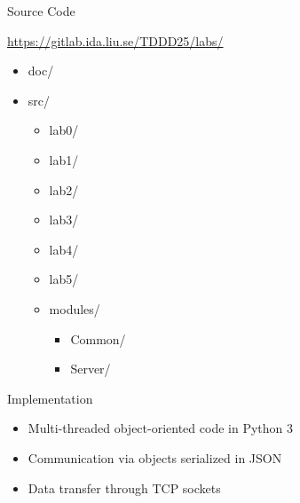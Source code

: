\documentclass[compress,xcolor=table]{beamer}
\begin{document}
\begin{frame}{Source Code}
  \centering
  \begin{center}
    \url{https://gitlab.ida.liu.se/TDDD25/labs/}
  \end{center}
  \begin{itemize}
    \item doc/
    \item src/
      \begin{itemize}
        \item lab0/
        \item lab1/
        \item lab2/
        \item lab3/
        \item lab4/
        \item lab5/
        \item modules/
          \begin{itemize}
            \item Common/
            \item Server/
          \end{itemize}
      \end{itemize}
  \end{itemize}
\end{frame}

\begin{frame}{Implementation}
  \begin{itemize}
    \item Multi-threaded object-oriented code in Python 3
    \item Communication via objects serialized in JSON
    \item Data transfer through TCP sockets
  \end{itemize}
\end{frame}
\end{document}
